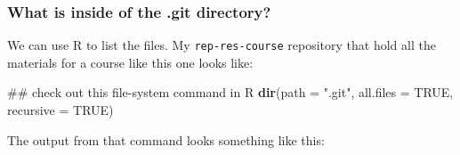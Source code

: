 \documentclass[]{book}
\newenvironment{Shaded}{\begin{snugshade}}{\end{snugshade}}
\newcommand{\KeywordTok}[1]{\textcolor[rgb]{0.13,0.29,0.53}{\textbf{{#1}}}}
\newcommand{\DataTypeTok}[1]{\textcolor[rgb]{0.13,0.29,0.53}{{#1}}}
\newcommand{\StringTok}[1]{\textcolor[rgb]{0.31,0.60,0.02}{{#1}}}
\newcommand{\OtherTok}[1]{\textcolor[rgb]{0.56,0.35,0.01}{{#1}}}
\newcommand{\NormalTok}[1]{{#1}}
\theoremstyle{definition}
\theoremstyle{definition}
\theoremstyle{remark}
\begin{document}
\subsubsection{What is inside of the .git
directory?}\label{what-is-inside-of-the-.git-directory}

We can use R to list the files. My \texttt{rep-res-course} repository
that hold all the materials for a course like this one looks like:

\begin{Shaded}
\begin{Highlighting}[]
\NormalTok{## check out this file-system command in R}
\KeywordTok{dir}\NormalTok{(}\DataTypeTok{path =} \StringTok{".git"}\NormalTok{, }\DataTypeTok{all.files =} \OtherTok{TRUE}\NormalTok{, }\DataTypeTok{recursive =} \OtherTok{TRUE}\NormalTok{)}
\end{Highlighting}
\end{Shaded}

The output from that command looks something like this:
\end{document}
